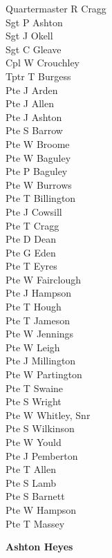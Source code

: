 \begin{multicols}{2}
  \noindent
  Quartermaster R Cragg \\
  Sgt P Ashton \\
  Sgt J Okell \\
  Sgt C Gleave \\
  Cpl W Crouchley \\
  Tptr T Burgess \\
  Pte J Arden \\
  Pte J Allen \\
  Pte J Ashton \\
  Pte S Barrow \\
  Pte W Broome \\
  Pte W Baguley \\
  Pte P Baguley \\
  Pte W Burrows \\
  Pte T Billington \\
  Pte J Cowsill \\
  Pte T Cragg \\
  Pte D Dean \\
  Pte G Eden \\
  Pte T Eyres \\
  Pte W Fairclough \\
  Pte J Hampson \\
  Pte T Hough \\
  Pte T Jameson \\
  Pte W Jennings \\
  Pte W Leigh \\
  Pte J Millington \\
  Pte W Partington \\
  Pte T Swaine \\
  Pte S Wright \\
  Pte W Whitley, Snr \\
  Pte S Wilkinson \\
  Pte W Yould \\
  Pte J Pemberton \\
  Pte T Allen \\
  Pte S Lamb \\
  Pte S Barnett \\
  Pte W Hampson \\
  Pte T Massey \\
\end{multicols}

\begin{center}
  \Large
  \textbf{Ashton Heyes}
\end{center}

